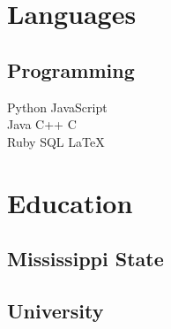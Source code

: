 \documentclass[]{resume}
\begin{document}
\begin{minipage}[t]{0.25\textwidth}
\sectionsep


\section{Languages}
\subsection{Programming}
Python \textbullet{} JavaScript \\
Java \textbullet{} C++ \textbullet{} C \\
Ruby \textbullet{} SQL \textbullet{} \LaTeX \\

\sectionsep



\section{Education}

\subsection{Mississippi State}
\subsection{University}



\end{minipage}
\end{document}
